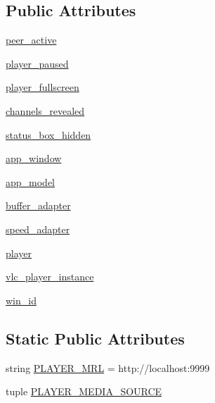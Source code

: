 \subsection*{Public Attributes}
\begin{DoxyCompactItemize}
\item 
\hyperlink{classsrc_1_1controller_1_1main__window__controller_1_1Main__Controller_a1948e4cb80685053917e03a14612e089}{peer\+\_\+active}
\item 
\hyperlink{classsrc_1_1controller_1_1main__window__controller_1_1Main__Controller_ac039cd23d7ca362fd4f690a6bc309e55}{player\+\_\+paused}
\item 
\hyperlink{classsrc_1_1controller_1_1main__window__controller_1_1Main__Controller_a1c8a9a57d035a929a9d6144a43d0d638}{player\+\_\+fullscreen}
\item 
\hyperlink{classsrc_1_1controller_1_1main__window__controller_1_1Main__Controller_ac4c44aa17e59f027b59d9107ebd0f3f9}{channels\+\_\+revealed}
\item 
\hyperlink{classsrc_1_1controller_1_1main__window__controller_1_1Main__Controller_ae4c003ad42661e26d748e65cd17d300a}{status\+\_\+box\+\_\+hidden}
\item 
\hyperlink{classsrc_1_1controller_1_1main__window__controller_1_1Main__Controller_a49ae628f7fdcae0e11ad80c730445a4f}{app\+\_\+window}
\item 
\hyperlink{classsrc_1_1controller_1_1main__window__controller_1_1Main__Controller_a27e86ec547ea99552036062c83b37e8f}{app\+\_\+model}
\item 
\hyperlink{classsrc_1_1controller_1_1main__window__controller_1_1Main__Controller_a083715c704f5714a979bc182543ee12c}{buffer\+\_\+adapter}
\item 
\hyperlink{classsrc_1_1controller_1_1main__window__controller_1_1Main__Controller_a69059e98e3211820b8a1d0e0d48212b1}{speed\+\_\+adapter}
\item 
\hyperlink{classsrc_1_1controller_1_1main__window__controller_1_1Main__Controller_a3e7af115a92d7f7668e25c38303db82e}{player}
\item 
\hyperlink{classsrc_1_1controller_1_1main__window__controller_1_1Main__Controller_ac74106459573d2785bfc819d8eef41c3}{vlc\+\_\+player\+\_\+instance}
\item 
\hyperlink{classsrc_1_1controller_1_1main__window__controller_1_1Main__Controller_ad15c49dcab2e7227f2708e253aedebe9}{win\+\_\+id}
\end{DoxyCompactItemize}
\subsection*{Static Public Attributes}
\begin{DoxyCompactItemize}
\item 
string \hyperlink{classsrc_1_1controller_1_1main__window__controller_1_1Main__Controller_a239c27fbd51a4917cd1dc953e65894dd}{P\+L\+A\+Y\+E\+R\+\_\+\+M\+R\+L} = \textquotesingle{}http\+://localhost\+:9999\textquotesingle{}
\item 
tuple \hyperlink{classsrc_1_1controller_1_1main__window__controller_1_1Main__Controller_a5d07980d496f8df891aa124c8cdf3074}{P\+L\+A\+Y\+E\+R\+\_\+\+M\+E\+D\+I\+A\+\_\+\+S\+O\+U\+R\+C\+E}
\end{DoxyCompactItemize}
